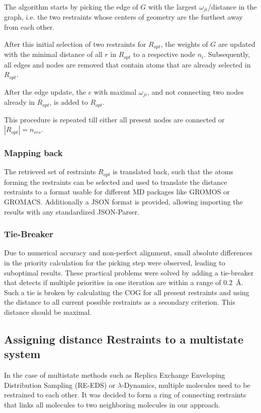The algorithm starts by picking the edge of $G$ with the largest $\omega_{ji}$/distance in the graph, i.e. the two restraints whose centers of geometry are the furthest away from each other. 

After this initial selection of two restraints for $R_{opt}$, the weights of $G$ are updated with the minimal distance of all $r$ in $R_{opt}$ to a respective node $n_i$. Subsequently, all edges and nodes are removed that contain atoms that are already selected in $R_{opt}$.

After the edge update, the $e$ with maximal $\omega_{ji}$, and not connecting two nodes already in $R_{opt}$,  is added to  $R_{opt}$.

This procedure is repeated till either all present nodes are connected or $|R_{opt}| = n_{res}$. 

\subsubsection{Mapping back}
The retrieved set of restraints $R_{opt}$ is translated back, such that the atoms forming the restraints can be selected and used to translate the distance restraints to a format usable for different MD packages like GROMOS or GROMACS. Additionally a JSON format is provided, allowing importing the results with any standardized JSON-Parser. \cite{Schmid2012, Abraham2015}


\subsubsection{Tie-Breaker}
Due to numerical accuracy and non-perfect alignment, small absolute differences in the priority calculation for the picking step were observed, leading to suboptimal results. These practical problems were solved by adding a tie-breaker that detects if multiple priorities in one iteration are within a range of $0.2$~\AA. 
Such a tie is broken by calculating the COG for all present restraints and using the distance to all current possible restraints as a secondary criterion. This distance should be maximal.


\subsection{Assigning distance Restraints to a multistate system}
In the case of multistate methods such as Replica Exchange Enveloping Distribution Sampling (RE-EDS) or $\lambda$-Dynamics, multiple molecules need to be restrained to each other. \cite{Sidler2016, knight2011} It was decided to form a ring of connecting restraints that links all molecules to two neighboring molecules in our approach.

